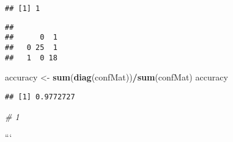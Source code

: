 \documentclass[
]{article}
\newenvironment{Shaded}{\begin{snugshade}}{\end{snugshade}}
\newcommand{\CommentTok}[1]{\textcolor[rgb]{0.56,0.35,0.01}{\textit{#1}}}
\newcommand{\KeywordTok}[1]{\textcolor[rgb]{0.13,0.29,0.53}{\textbf{#1}}}
\newcommand{\NormalTok}[1]{#1}
\newcommand{\OperatorTok}[1]{\textcolor[rgb]{0.81,0.36,0.00}{\textbf{#1}}}
\newcommand{\StringTok}[1]{\textcolor[rgb]{0.31,0.60,0.02}{#1}}
\begin{document}
\begin{verbatim}
## [1] 1
\end{verbatim}

\begin{Shaded}
\end{Shaded}

\begin{verbatim}
##    
##      0  1
##   0 25  1
##   1  0 18
\end{verbatim}

\begin{Shaded}
\begin{Highlighting}[]
\NormalTok{accuracy <-}\StringTok{ }\KeywordTok{sum}\NormalTok{(}\KeywordTok{diag}\NormalTok{(confMat))}\OperatorTok{/}\KeywordTok{sum}\NormalTok{(confMat)}
\NormalTok{accuracy}
\end{Highlighting}
\end{Shaded}

\begin{verbatim}
## [1] 0.9772727
\end{verbatim}

\begin{Shaded}
\begin{Highlighting}[]
\CommentTok{# 1}
\end{Highlighting}
\end{Shaded}

```
\end{document}
